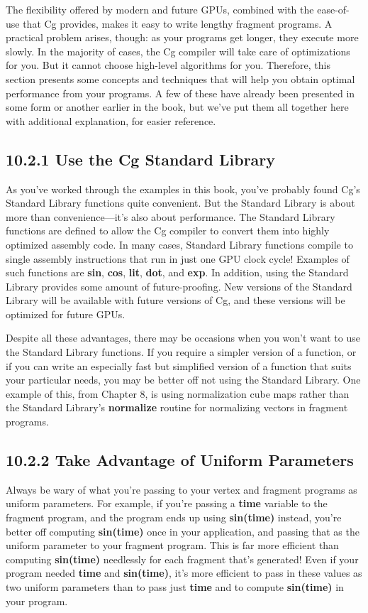\documentclass[../main.tex]{subfiles}
\begin{document}
The flexibility offered by modern and future GPUs, combined with the ease-of-use that Cg provides, makes it easy to write lengthy fragment programs. A practical problem arises, though: as your programs get longer, they execute more slowly. In the majority of cases, the Cg compiler will take care of optimizations for you. But it cannot choose high-level algorithms for you. Therefore, this section presents some concepts and techniques that will help you obtain optimal performance from your programs. A few of these have already been presented in some form or another earlier in the book, but we've put them all together here with additional explanation, for easier reference.

\subsection{10.2.1 Use the Cg Standard Library}

As you've worked through the examples in this book, you've probably found Cg's Standard Library functions quite convenient. But the Standard Library is about more than convenience—it's also about performance. The Standard Library functions are defined to allow the Cg compiler to convert them into highly optimized assembly code. In many cases, Standard Library functions compile to single assembly instructions that run in just one GPU clock cycle! Examples of such functions are \textbf{sin}, \textbf{cos}, \textbf{lit}, \textbf{dot}, and \textbf{exp}. In addition, using the Standard Library provides some amount of future-proofing. New versions of the Standard Library will be available with future versions of Cg, and these versions will be optimized for future GPUs.

Despite all these advantages, there may be occasions when you won't want to use the Standard Library functions. If you require a simpler version of a function, or if you can write an especially fast but simplified version of a function that suits your particular needs, you may be better off not using the Standard Library. One example of this, from Chapter 8, is using normalization cube maps rather than the Standard Library's \textbf{normalize} routine for normalizing vectors in fragment programs.

\subsection{10.2.2 Take Advantage of Uniform Parameters}

Always be wary of what you're passing to your vertex and fragment programs as uniform parameters. For example, if you're passing a \textbf{time} variable to the fragment program, and the program ends up using \textbf{sin(time)} instead, you're better off computing \textbf{sin(time)} once in your application, and passing that as the uniform parameter to your fragment program. This is far more efficient than computing \textbf{sin(time)} needlessly for each fragment that's generated! Even if your program needed \textbf{time} and \textbf{sin(time)}, it's more efficient to pass in these values as two uniform parameters than to pass just \textbf{time} and to compute \textbf{sin(time)} in your program.
\end{document}
